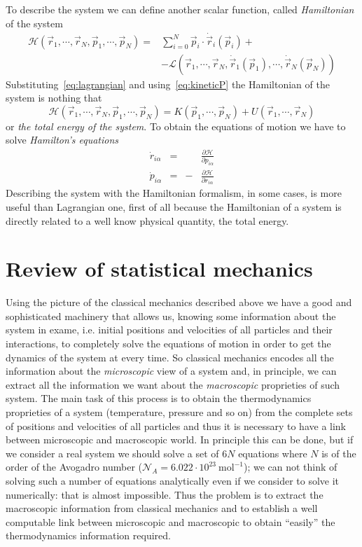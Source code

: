 To describe the system we can define another scalar function, called \textit{Hamiltonian} of the system
\begin{align*}
	\mathcal{H}(\vec r_1,\cdots,\vec r_N, \vec p_1, \cdots, \vec p_N) = &\sum_{i=0}^N \vec p_i \cdot \dot{\vec r}_i(\vec p_i) + \nonumber \\
	&-\mathcal{L}(\vec r_1, \cdots, \vec r_N, \dot{\vec r}_1(\vec p_1),\cdots,\dot{\vec r}_N(\vec p_N))
\end{align*}
Substituting~\eqref{eq:lagrangian} and using~\eqref{eq:kineticP} the Hamiltonian of the system is nothing that
\begin{equation}
	\mathcal{H}(\vec r_1,\cdots,\vec r_N, \vec p_1, \cdots, \vec p_N) = K(\vec p_1, \cdots, \vec p_N) + U(\vec r_1,\cdots,\vec r_N)
	\label{eq:hamiltonian}
\end{equation}
or \textit{the total energy of the system}. To obtain the equations of motion we have to solve \textit{Hamilton's equations}
\begin{equation}
	\begin{aligned}
		\dot r_{i\alpha} &=& &\frac{\partial\mathcal{H}}{\partial p_{i\alpha}} \\
		\dot p_{i\alpha} &=&-&\frac{\partial\mathcal{H}}{\partial r_{i\alpha}}
	\end{aligned}
	\label{eq:eqhamilton}
\end{equation}
Describing the system with the Hamiltonian formalism, in some cases, is more useful than Lagrangian one, first of
all because the Hamiltonian of a system is directly related to a well know physical quantity, the total energy.

\section{Review of statistical mechanics}
Using the picture of the classical mechanics described above we have a good and sophisticated machinery that allows us, knowing some information about the system in exame, i.e. initial positions and velocities of all particles and their interactions, to completely solve the equations of motion in order to get the dynamics of the system at every time. So classical mechanics encodes all the information about the \textit{microscopic} view of a system and, in principle, we can extract all the information we want about the \textit{macroscopic} proprieties of such system.
The main task of this process is to obtain the thermodynamics proprieties of a system (temperature, pressure and so on) from the complete sets of positions and velocities of all particles and thus it is necessary to have a link between microscopic and macroscopic world. In principle this can be done, but if we consider a real system we should solve a set of $6N$ equations where $N$ is of the order of the Avogadro number ($\mathcal{N}_A = 6.022 \cdot 10^{23}~\text{mol}^{-1}$); we can not think of solving such a number of equations analytically even if we consider to solve it numerically: that is almost impossible. Thus the problem is to extract the macroscopic information from classical mechanics and to establish a well computable link between microscopic and macroscopic to obtain ``easily'' the thermodynamics information required.

